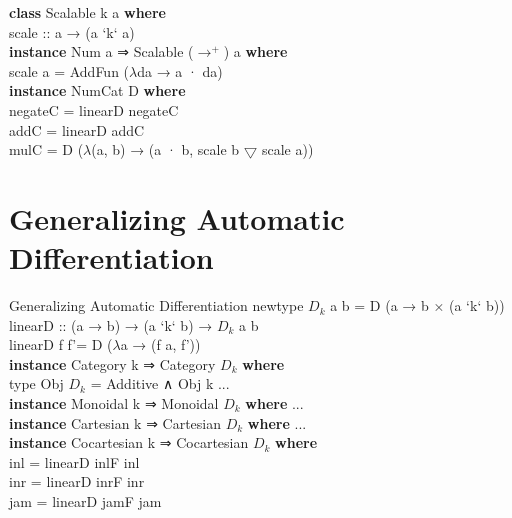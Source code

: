 \documentclass{beamer}
\begin{document}
\begin{frame}
    \textbf{class} Scalable k a \textbf{where}\\
        \hspace{1cm}scale :: a → (a ‘k‘ a)\\
    \vspace{2mm} 
    \textbf{instance} Num a ⇒ Scalable ($\to^+$) a \textbf{where}\\
        \hspace{1cm}scale a = AddFun ($\lambda$da → a · da)\\
    \vspace{5mm} 
    \textbf{instance} NumCat D \textbf{where}\\
        \hspace{1cm}negateC = linearD negateC\\
        \hspace{1cm}addC = linearD addC\\
        \hspace{1cm}mulC = D ($\lambda$(a, b) → (a · b, scale b $\bigtriangledown$ scale a))\\
\end{frame}

\section{Generalizing Automatic Differentiation}
\begin{frame}{Generalizing Automatic Differentiation}
    newtype $D_k$ a b = D (a → b × (a ‘k‘ b))\\
    \vspace{2mm} 
    linearD :: (a → b) → (a ‘k‘ b) → $D_k$ a b\\
    linearD f f'= D ($\lambda$a → (f a, f'))\\
    \vspace{2mm} 
    \textbf{instance} Category k ⇒ Category $D_k$ \textbf{where}\\
        \hspace{1cm}type Obj $D_k$ = Additive ∧ Obj k ...\\
    \vspace{2mm} 
    \textbf{instance} Monoidal k ⇒ Monoidal $D_k$ \textbf{where} ...\\
    \vspace{2mm} 
    \textbf{instance} Cartesian k ⇒ Cartesian $D_k$ \textbf{where} ...\\
    \vspace{2mm} 
    \textbf{instance} Cocartesian k ⇒ Cocartesian $D_k$ \textbf{where}\\
        \hspace{1cm}inl = linearD inlF inl\\
        \hspace{1cm}inr = linearD inrF inr\\
        \hspace{1cm}jam = linearD jamF jam\\
    \vspace{2mm} 
\end{frame}
\end{document}
